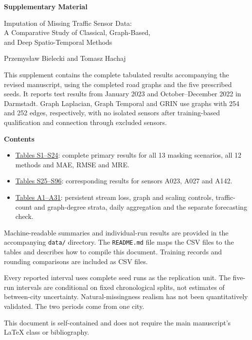 \documentclass[10pt,a4paper]{article}
\begin{document}
\begin{center}
{\LARGE\bfseries Supplementary Material\par}
\vspace{8mm}
{\Large Imputation of Missing Traffic Sensor Data:\\
A Comparative Study of Classical, Graph-Based,\\
and Deep Spatio-Temporal Methods\par}
\vspace{5mm}
Przemys{\l}aw Bielecki and Tomasz Hachaj
\end{center}
\vspace{8mm}
This supplement contains the complete tabulated results accompanying the revised manuscript, using the completed road graphs and the five prescribed seeds. It reports test results from January 2023 and October--December 2022 in Darmstadt. Graph Laplacian, Graph Temporal and GRIN use graphs with 254 and 252 edges, respectively, with no isolated sensors after training-based qualification and connection through excluded sensors.

\textbf{Contents}
\begin{itemize}
\item \hyperref[tab:supp_p01_1]{Tables S1--S24}: complete primary results for all 13 masking scenarios, all 12 methods and MAE, RMSE and MRE.
\item \hyperref[tab:supp_p01_25]{Tables S25--S96}: corresponding results for sensors A023, A027 and A142.
\item \hyperref[tab:p03_A1]{Tables A1--A31}: persistent stream loss, graph and scaling controls, traffic-count and graph-degree strata, daily aggregation and the separate forecasting check.
\end{itemize}

Machine-readable summaries and individual-run results are provided in the accompanying \texttt{data/} directory. The \texttt{README.md} file maps the CSV files to the tables and describes how to compile this document. Training records and rounding comparisons are included as CSV files.

Every reported interval uses complete seed runs as the replication unit. The five-run intervals are conditional on fixed chronological splits, not estimates of between-city uncertainty. Natural-missingness realism has not been quantitatively validated. The two periods come from one city.

This document is self-contained and does not require the main manuscript's LaTeX class or bibliography.
\clearpage
\renewcommand{\theHtable}{S\arabic{table}}

\clearpage
\renewcommand{\theHtable}{A\arabic{table}}

\end{document}
